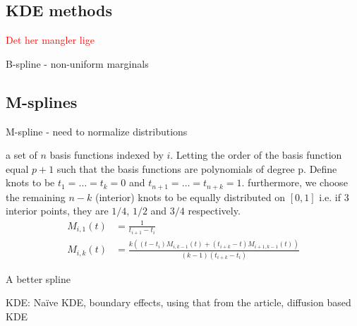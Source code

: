 \documentclass[../Thesis.tex]{subfiles}
\begin{document}
\subsection{KDE methods}\label{subsec:Mutual information estimation and KDE methods}
\textcolor{red}{Det her mangler lige}


B-spline - non-uniform marginals


\subsection{M-splines}
M-spline - need to normalize distributions

\cite{Monotone-Regression-Splines-in-Action} a set of $n$ basis functions indexed by $i$. Letting the order of the basis function equal $p+1$ such that the basis functions are polynomials of degree p. Define knots to be $t_1 = \dots = t_k = 0$ and $t_{n+1} = \dots = t_{n+k} = 1$. furthermore, we choose the remaining $n-k$ (interior) knots to be equally distributed on $[0,1]$ i.e. if $3$ interior points, they are $1/4$, $1/2$ and $3/4$ respectively.
\begin{align}
    M_{i,1}\left(t\right) &= \frac{1}{t_{i+1} - t_i}\\
    M_{i,k}\left(t\right) &= \frac{k\left( \left(t - t_i\right) M_{i,k-1}\left(t\right) + \left(t_{i+k} - t\right) M_{i+1,k-1}\left(t\right)\right)}{\left(k-1\right) \left(t_{i+k} - t_{i}\right)} 
\end{align}

A better spline


KDE: Naïve KDE, boundary effects, using that from the article, diffusion based KDE
\end{document}
